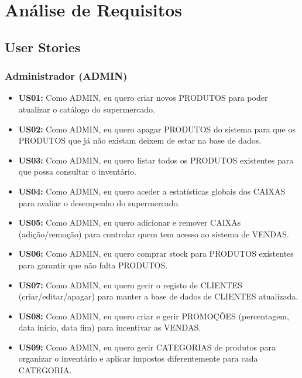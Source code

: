 \documentclass[a4paper]{llncs}
\begin{document}
\section{Análise de Requisitos}

\subsection{User Stories}

\subsubsection{Administrador (ADMIN)}
\begin{itemize}
    \item \textbf{US01:} Como ADMIN, eu quero criar novos PRODUTOS para poder atualizar o catálogo do supermercado.
    \item \textbf{US02:} Como ADMIN, eu quero apagar PRODUTOS do sistema para que os PRODUTOS que já não existam deixem de estar na base de dados.
    \item \textbf{US03:} Como ADMIN, eu quero listar todos os PRODUTOS existentes para que possa consultar o inventário.
    \item \textbf{US04:} Como ADMIN, eu quero aceder a estatísticas globais dos CAIXAS para avaliar o desempenho do supermercado.
    \item \textbf{US05:} Como ADMIN, eu quero adicionar e remover CAIXAs (adição/remoção) para controlar quem tem acesso ao sistema de VENDAS.
    \item \textbf{US06:} Como ADMIN, eu quero comprar stock para PRODUTOS existentes para garantir que não falta PRODUTOS.
    \item \textbf{US07:} Como ADMIN, eu quero gerir o registo de CLIENTES (criar/editar/apagar) para manter a base de dados de CLIENTES atualizada.
    \item \textbf{US08:} Como ADMIN, eu quero criar e gerir PROMOÇÕES (percentagem, data início, data fim) para incentivar as VENDAS.
    \item \textbf{US09:} Como ADMIN, eu quero gerir CATEGORIAS de produtos para organizar o inventário e aplicar impostos diferentemente para cada CATEGORIA.
\end{itemize}
\end{document}

